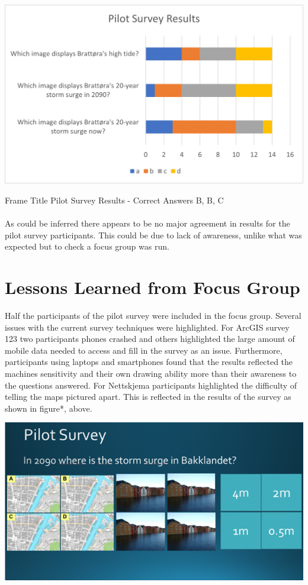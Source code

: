 \paragraph{}
\includegraphics[width=1\textwidth]{fig_results/pilot-survey-results.png}
\begin{frame}{Frame Title}
    Pilot Survey Results - Correct Answers B, B, C
\end{frame}
\paragraph{}

As could be inferred there appears to be no major agreement in results for the pilot survey participants. This could be due to lack of awareness, unlike what was expected but to check a focus group was run. 

\section{Lessons Learned from Focus Group}
Half the participants of the pilot survey were included in the focus group. Several issues with the current survey techniques were highlighted. For ArcGIS survey 123 two participants phones crashed and others highlighted the large amount of mobile data needed to access and fill in the survey as an issue. Furthermore, participants using laptops and smartphones found that the results reflected the machines sensitivity and their own drawing ability more than their awareness to the questions answered. For Nettskjema participants highlighted the difficulty of telling the maps pictured apart. This is reflected in the results of the survey as shown in figure*, above.

\includegraphics[width=1\textwidth]{fig_results/slide shown in focus group.png}

